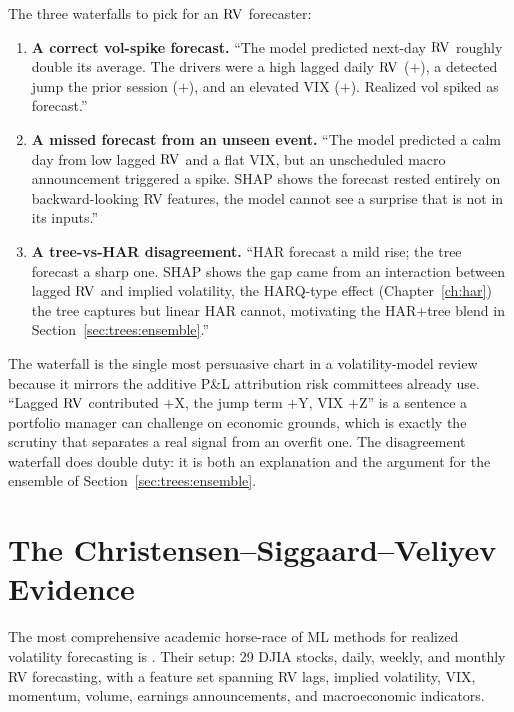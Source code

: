 The three waterfalls to pick for an $\operatorname{RV}$ forecaster:
\begin{enumerate}[leftmargin=1.8em]
  \item \textbf{A correct vol-spike forecast.}  ``The model predicted
        next-day $\operatorname{RV}$ roughly double its average.  The drivers were a high
        lagged daily $\operatorname{RV}$ ($+$), a detected jump the prior session ($+$),
        and an elevated VIX ($+$).  Realized vol spiked as forecast.''
  \item \textbf{A missed forecast from an unseen event.}  ``The model
        predicted a calm day from low lagged $\operatorname{RV}$ and a flat VIX, but an
        unscheduled macro announcement triggered a spike.  SHAP shows the
        forecast rested entirely on backward-looking RV features, the model
        cannot see a surprise that is not in its inputs.''
  \item \textbf{A tree-vs-HAR disagreement.}  ``HAR forecast a mild rise;
        the tree forecast a sharp one.  SHAP shows the gap came from an
        interaction between lagged $\operatorname{RV}$ and implied volatility, the
        HARQ-type effect (Chapter~\ref{ch:har}) the tree captures but linear
        HAR cannot, motivating the HAR$+$tree blend in
        Section~\ref{sec:trees:ensemble}.''
\end{enumerate}

\begin{projectconnection}
The waterfall is the single most persuasive chart in a volatility-model
review because it mirrors the additive P\&L attribution risk committees
already use.  ``Lagged $\operatorname{RV}$ contributed $+$X, the jump term $+$Y, VIX $+$Z''
is a sentence a portfolio manager can challenge on economic grounds, which is
exactly the scrutiny that separates a real signal from an overfit one.  The
disagreement waterfall does double duty: it is both an explanation and the
argument for the ensemble of Section~\ref{sec:trees:ensemble}.
\end{projectconnection}



\section{The Christensen--Siggaard--Veliyev Evidence}\label{sec:trees:csv}

The most comprehensive academic horse-race of ML methods for realized
volatility forecasting is \citet{ChristensenSiggaardVeliyev2023}.  Their
setup: 29 DJIA stocks, daily, weekly, and monthly RV forecasting, with a
feature set spanning RV lags, implied volatility, VIX, momentum, volume,
earnings announcements, and macroeconomic indicators.

